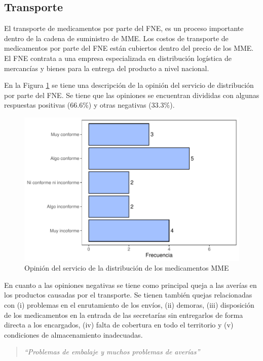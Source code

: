 \documentclass[
]{book}
\begin{document}
\hypertarget{transporte}{%
\subsection{Transporte}\label{transporte}}

El transporte de medicamentos por parte del FNE, es un proceso importante dentro de la cadena de suministro de MME. Los costos de transporte de medicamentos por parte del FNE están cubiertos dentro del precio de los MME. El FNE contrata a una empresa especializada en distribución logística de mercancías y bienes para la entrega del producto a nivel nacional.

En la Figura \ref{fig:TransporteProductos} se tiene una descripción de la opinión del servicio de distribución por parte del FNE. Se tiene que las opiniones se encuentran divididas con algunas respuestas positivas (66.6\%) y otras negativas (33.3\%).

\begin{figure}
\includegraphics[width=0.85\linewidth]{InformeFinal_files/figure-latex/TransporteProductos-1} \caption{Opinión del servicio de la distribución de los medicamentos MME}\label{fig:TransporteProductos}
\end{figure}

En cuanto a las opiniones negativas se tiene como principal queja a las averías en los productos causadas por el transporte. Se tienen también quejas relacionadas con (i) problemas en el enrutamiento de los envíos, (ii) demoras, (iii) disposición de los medicamentos en la entrada de las secretarías sin entregarlos de forma directa a los encargados, (iv) falta de cobertura en todo el territorio y (v) condiciones de almacenamiento inadecuadas.

\begin{quote}
\emph{``Problemas de embalaje y muchos problemas de averías''}
\end{quote}
\end{document}
